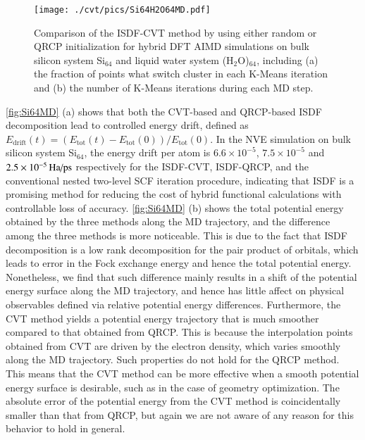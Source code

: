 \begin{figure}[htbp]
	\begin{center}
		\texttt{[image: ./cvt/pics/Si64H2O64MD.pdf]}
	\end{center}
	\caption{Comparison of the ISDF\hyp{}CVT method by using either random or QRCP
	initialization for hybrid DFT AIMD simulations on bulk silicon system Si$_
	{64}$ and liquid water system (H$_2$O)$_{64}$, including (a) the fraction of
	points what switch cluster in each K\hyp{}Means iteration and (b) the number
	of K\hyp{}Means iterations during each MD step.}\label{fig:Si64H2O64MD}
\end{figure}

\cref{fig:Si64MD} (a) shows that both the CVT\hyp{}based and QRCP\hyp{}based
ISDF decomposition lead to controlled energy drift, defined as $E_{
\mathrm{drift}}(t)= (E_{\mathrm{tot}}(t)- E_{\mathrm{tot}}(0))/E_{\mathrm{tot}}
(0)$. In the NVE simulation on bulk silicon system Si$_{64}$, the energy drift
per atom is $6.6\times 10^{-5}$, $7.5 \times 10^{-5}$ and $2.5 \times 10^
{-5}\HaPps$ respectively for the ISDF\hyp{}CVT, ISDF\hyp{}QRCP, and the
conventional nested two\hyp{}level SCF iteration procedure, indicating that ISDF
is a promising method for reducing the cost of hybrid functional calculations
with controllable loss of accuracy. \cref{fig:Si64MD} (b) shows the total
potential energy obtained by the three methods along the MD trajectory, and the
difference among the three methods is more noticeable. This is due to the fact
that ISDF decomposition is a low rank decomposition for the pair product of
orbitals, which leads to error in the Fock exchange energy and hence the total
potential energy. Nonetheless, we find that such difference mainly results in a
shift of the potential energy surface along the MD trajectory, and hence has
little affect on physical observables defined via relative potential energy
differences. Furthermore, the CVT method yields a potential energy trajectory
that is much smoother compared to that obtained from QRCP. This is because the
interpolation points obtained from CVT are driven by the electron density, which
varies smoothly along the MD trajectory. Such properties do not hold for the
QRCP method. This means that the CVT method can be more effective when a smooth
potential energy surface is desirable, such as in the case of geometry
optimization. The absolute error of the potential energy from the CVT method is
coincidentally smaller than that from QRCP, but again we are not aware of any
reason for this behavior to hold in general.

